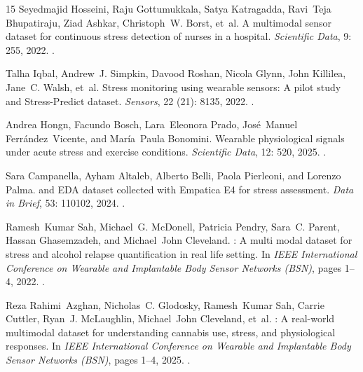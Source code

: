 \documentclass{article}
\begin{document}
\begin{thebibliography}{15}
Seyedmajid Hosseini, Raju Gottumukkala, Satya Katragadda, Ravi~Teja
  Bhupatiraju, Ziad Ashkar, Christoph~W. Borst, et~al.
\newblock A multimodal sensor dataset for continuous stress detection of nurses
  in a hospital.
\newblock \emph{Scientific Data}, 9: 255, 2022.
\newblock {}.

Talha Iqbal, Andrew~J. Simpkin, Davood Roshan, Nicola Glynn, John Killilea,
  Jane~C. Walsh, et~al.
\newblock Stress monitoring using wearable sensors: A pilot study and
  {Stress-Predict} dataset.
\newblock \emph{Sensors}, 22 (21): 8135, 2022.
\newblock {}.

Andrea Hongn, Facundo Bosch, Lara~Eleonora Prado, Jos{\'e}~Manuel
  Ferr{\'a}ndez~Vicente, and Mar{\'i}a~Paula Bonomini.
\newblock Wearable physiological signals under acute stress and exercise
  conditions.
\newblock \emph{Scientific Data}, 12: 520, 2025.
\newblock {}.

Sara Campanella, Ayham Altaleb, Alberto Belli, Paola Pierleoni, and Lorenzo
  Palma.
 and {EDA} dataset collected with {Empatica E4} for stress
  assessment.
\newblock \emph{Data in Brief}, 53: 110102, 2024.
\newblock {}.

Ramesh~Kumar Sah, Michael~G. McDonell, Patricia Pendry, Sara~C. Parent, Hassan
  Ghasemzadeh, and Michael~John Cleveland.
: A multi modal dataset for stress and alcohol relapse
  quantification in real life setting.
\newblock In \emph{IEEE International Conference on Wearable and Implantable
  Body Sensor Networks (BSN)}, pages 1--4, 2022.
\newblock {}.

Reza Rahimi~Azghan, Nicholas~C. Glodosky, Ramesh~Kumar Sah, Carrie Cuttler,
  Ryan~J. McLaughlin, Michael~John Cleveland, et~al.
: A real-world multimodal dataset for understanding
  cannabis use, stress, and physiological responses.
\newblock In \emph{IEEE International Conference on Wearable and Implantable
  Body Sensor Networks (BSN)}, pages 1--4, 2025.
\newblock {}.


\end{thebibliography}
\end{document}
